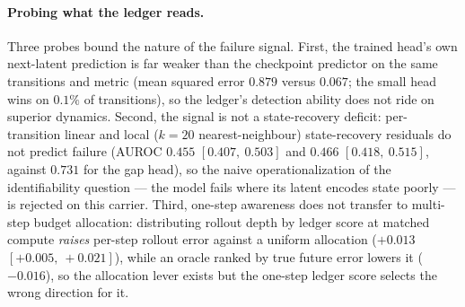 \paragraph{Probing what the ledger reads.}
Three probes bound the nature of the failure signal.  First, the trained
head's own next-latent prediction is far weaker than the checkpoint predictor
on the same transitions and metric (mean squared error $0.879$ versus
$0.067$; the small head wins on $0.1\%$ of transitions), so the ledger's
detection ability does not ride on superior dynamics.  Second, the signal is
not a state-recovery deficit: per-transition linear and local ($k=20$
nearest-neighbour) state-recovery residuals do not predict failure (AUROC
$0.455$ $[0.407,\ 0.503]$ and $0.466$ $[0.418,\ 0.515]$, against $0.731$ for
the gap head), so the naive operationalization of the identifiability
question --- the model fails where its latent encodes state poorly --- is
rejected on this carrier.  Third, one-step awareness does not transfer to
multi-step budget allocation: distributing rollout depth by ledger score at
matched compute \emph{raises} per-step rollout error against a uniform
allocation ($+0.013$ $[+0.005,\ +0.021]$), while an oracle ranked by true
future error lowers it ($-0.016$), so the allocation lever exists but the
one-step ledger score selects the wrong direction for it.

